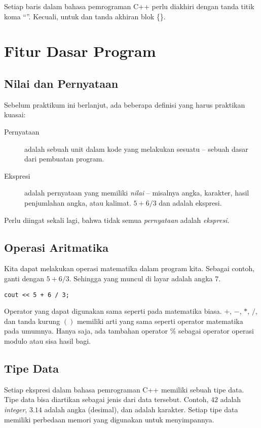 \documentclass[../main.tex]{subfiles}
\begin{document}
Setiap baris dalam bahasa pemrograman C++ perlu diakhiri dengan tanda titik koma
\enquote{\code{;}}. Kecuali, untuk  dan
tanda akhiran blok \{\}.

\section{Fitur Dasar Program}
\subsection{Nilai dan Pernyataan}
Sebelum praktikum ini berlanjut, ada beberapa definisi yang harus praktikan
kuasai:

\begin{description}
\item[Pernyataan] adalah sebuah unit dalam kode yang melakukan sesuatu -- sebuah
  dasar dari pembuatan program.
\item[Ekspresi] adalah pernyataan yang memiliki \emph{nilai} -- misalnya angka,
  karakter, hasil penjumlahan angka, atau kalimat. \(5 + 6 / 3\) dan
   adalah ekspresi.
\end{description}

Perlu diingat sekali lagi, bahwa tidak semua \emph{pernyataan} adalah
\emph{ekspresi}.

\subsection{Operasi Aritmatika}
Kita dapat melakukan operasi matematika dalam program kita. Sebagai contoh,
ganti  dengan \(5 + 6 / 3\). Sehingga yang
muncul di layar adalah angka \(7\).

\begin{verbatim}
cout << 5 + 6 / 3;
\end{verbatim}

Operator yang dapat digunakan sama seperti pada matematika biasa. \(+\), \(-\),
\(*\), \(/\), dan tanda kurung \(()\) memiliki arti yang sama seperti operator matematika
pada umumnya. Hanya saja, ada tambahan operator \(\%\) sebagai operator operasi
modulo atau sisa hasil bagi.

\subsection{Tipe Data}
Setiap ekspresi dalam bahasa pemrograman C++ memiliki sebuah tipe data. Tipe
data bisa diartikan sebagai jenis dari data tersebut. Contoh, \(42\) adalah
\emph{integer}, \(3.14\) adalah angka  (desimal), dan
 adalah karakter. Setiap tipe data memiliki perbedaan memori yang
digunakan untuk menyimpannya.
\end{document}

